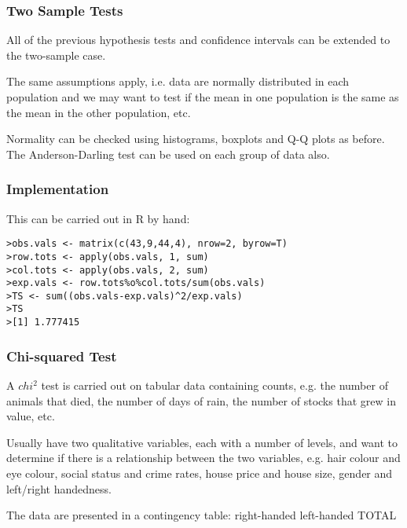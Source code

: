 \subsubsection{Two Sample Tests}


All of the previous hypothesis tests and confidence intervals can be
extended to the two-sample case.

The same assumptions apply, i.e. data are normally distributed in
each population and we may want to test if the mean in one
population is the same as the mean in the other population, etc.

Normality can be checked using histograms, boxplots and Q-Q
plots as before. The Anderson-Darling test can be used on
each group of data also.


\subsubsection{Implementation}

This can be carried out in R by hand:

\footnotesize \begin{verbatim}
>obs.vals <- matrix(c(43,9,44,4), nrow=2, byrow=T)
>row.tots <- apply(obs.vals, 1, sum)
>col.tots <- apply(obs.vals, 2, sum)
>exp.vals <- row.tots%o%col.tots/sum(obs.vals)
>TS <- sum((obs.vals-exp.vals)^2/exp.vals)
>TS
>[1] 1.777415
\end{verbatim}\normalsize




\subsubsection{Chi-squared Test}

A $chi^2$ test is carried out on tabular data containing counts, e.g. the
number of animals that died, the number of days of rain, the
number of stocks that grew in value, etc.

Usually have two qualitative variables, each with a number of
levels, and want to determine if there is a relationship between the
two variables, e.g. hair colour and eye colour, social status and
crime rates, house price and house size, gender and left/right
handedness.

The data are presented in a contingency table:
right-handed left-handed TOTAL

